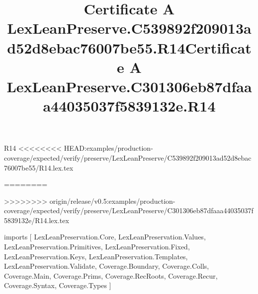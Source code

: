 \begin{lexlean}{R14}
<<<<<<<< HEAD:examples/production-coverage/expected/verify/preserve/LexLeanPreserve/C539892f209013ad52d8ebac76007be55/R14.lex.tex
\title{Certificate A LexLeanPreserve.C539892f209013ad52d8ebac76007be55.R14}
========
\title{Certificate A LexLeanPreserve.C301306eb87dfaaa44035037f5839132e.R14}
>>>>>>>> origin/release/v0.5:examples/production-coverage/expected/verify/preserve/LexLeanPreserve/C301306eb87dfaaa44035037f5839132e/R14.lex.tex
\begin{coremodule}
imports [
  LexLeanPreservation.Core,
  LexLeanPreservation.Values,
  LexLeanPreservation.Primitives,
  LexLeanPreservation.Fixed,
  LexLeanPreservation.Keys,
  LexLeanPreservation.Templates,
  LexLeanPreservation.Validate,
  Coverage.Boundary,
  Coverage.Colls,
  Coverage.Main,
  Coverage.Prims,
  Coverage.RecRoots,
  Coverage.Recur,
  Coverage.Syntax,
  Coverage.Types
]


\end{coremodule}
\end{lexlean}

